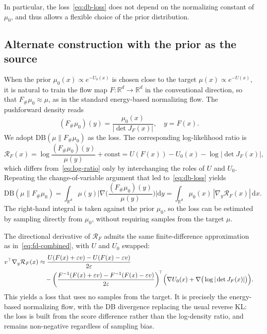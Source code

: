 \documentclass{article}
\newcommand{\D}{\mathrm{d}}
\newcommand{\DB}{\mathrm{DB}}
\theoremstyle{plain}
\begin{document}
In particular, the loss~\eqref{eq:db-loss} does not depend on the normalizing constant of $\mu_0$, and thus allows a flexible choice of the prior distribution.

\subsection{Alternate construction with the prior as the source}\label{sec:alt-loss}

When the prior $\mu_0(x) \propto e^{-U_0(x)}$ is chosen close to the target $\mu(x) \propto e^{-U(x)}$, it is natural to train the flow map $F\colon \mathbb R^d \to \mathbb R^d$ in the conventional direction, so that $F_{\#}\mu_0 \approx \mu$, as in the standard energy-based normalizing flow. The pushforward density reads
\begin{equation*}
    (F_{\#}\mu_0)(y) = \frac{\mu_0(x)}{|\det J_F(x)|}, \quad y = F(x).
\end{equation*}
We adopt $\DB(\mu \| F_{\#}\mu_0)$ as the loss. The corresponding log-likelihood ratio is
\begin{equation}\label{eq:log-ratio-alt}
    \mathcal R_F(x) = \log \frac{(F_{\#}\mu_0)(y)}{\mu(y)} + \mathrm{const} = U(F(x)) - U_0(x) - \log|\det J_F(x)|,
\end{equation}
which differs from~\eqref{eq:log-ratio} only by interchanging the roles of $U$ and $U_0$. Repeating the change-of-variable argument that led to~\eqref{eq:db-loss} yields
\begin{equation}\label{eq:db-loss-alt}
    \DB(\mu\| F_{\#}\mu_0) = \int_{\mathbb R^d} \mu(y) \biggl|\nabla\biggl(\frac{(F_{\#}\mu_0)(y)}{\mu(y)}\biggr)\biggr| \D y = \int_{\mathbb R^d} \mu_0(x)\, |\nabla_y \mathcal R_F(x)|\,\D x.
\end{equation}
The right-hand integral is taken against the prior $\mu_0$, so the loss can be estimated by sampling directly from $\mu_0$, without requiring samples from the target $\mu$.

The directional derivative of $\mathcal R_F$ admits the same finite-difference approximation as in~\eqref{eq:fd-combined}, with $U$ and $U_0$ swapped:
\begin{align}\label{eq:fd-combined-alt}
    v^\top \nabla_y \mathcal R_F(x) &\approx \frac{U(F(x) + \varepsilon v) - U(F(x) - \varepsilon v)}{2\varepsilon} \notag\\
    &\quad - \biggl(\frac{F^{-1}(F(x) + \varepsilon v) - F^{-1}(F(x) - \varepsilon v)}{2\varepsilon}\biggr)^{\!\top} \Bigl(
        \nabla U_0(x) + \nabla \big(\log|\det J_F(x)|\big)
    \Bigr).
\end{align}
This yields a loss that uses no samples from the target. It is precisely the energy-based normalizing flow, with the DB divergence replacing the usual reverse KL: the loss is built from the score difference rather than the log-density ratio, and remains non-negative regardless of sampling bias.
\end{document}
